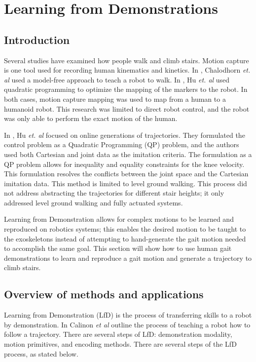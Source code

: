 
\section{Learning from Demonstrations}
\label{sec:lfd}

\subsection{Introduction}


 Several studies have examined how people walk and climb stairs. Motion capture is one tool used for recording human kinematics and kinetics. In  \cite{chalodhorn2007learning}, Chalodhorn \textit{et. al} used a model-free approach to teach a robot to walk. In  \cite{hu2014online}, Hu \textit{et. al} used quadratic programming to optimize the mapping of the markers to the robot. In both cases, motion capture mapping was used to map from a human to a humanoid robot. This research was limited to direct robot control, and the robot was only able to perform the exact motion of the human.

 In \cite{taskjointmocap}, Hu \textit{et. al} focused on online generations of trajectories. They formulated the control problem as a Quadratic Programming (QP) problem, and the authors used both Cartesian and joint data as the imitation criteria. The formulation as a QP problem allows for inequality and equality constraints for the knee velocity. This formulation resolves the conflicts between the joint space and the Cartesian imitation data. This method is limited to level ground walking. This process did not address abstracting the trajectories for different stair heights; it only addressed level ground walking and fully actuated systems.
 
 Learning from Demonstration allows for complex motions to be learned and reproduced on robotics systems; this enables the desired motion to be taught to the exoskeletons instead of attempting to hand-generate the gait motion needed to accomplish the same goal. This section will show how to use human gait demonstrations to learn and reproduce a gait motion and generate a trajectory to climb stairs.  


\subsection{Overview of methods and applications}
Learning from Demonstration (LfD) is the process of transferring skills to a robot by demonstration. In \cite{siciliano2016springer}  \cite{kormushev2011imitation} \cite{calinon2007teacher} Calinon \textit{et al} outline the process of teaching a robot how to follow a trajectory. There are several steps of LfD: demonstration modality, motion primitives, and encoding methods. There are several steps of the LfD process, as stated below. 

